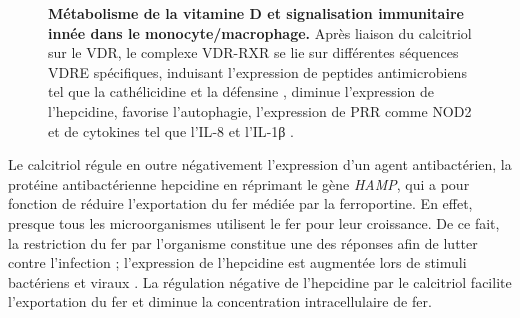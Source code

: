 \documentclass[
  a4paper,
  DIV=11,
  numbers=noendperiod,
  listof=totoc]{scrreprt}
\begin{document}
\begin{figure}


\caption[Métabolisme de la vitamine D et signalisation immunitaire innée
dans le
monocyte/macrophage.]{\label{fig-vd-immune-signaling}\textbf{Métabolisme
de la vitamine D et signalisation immunitaire innée dans le
monocyte/macrophage.} Après liaison du calcitriol sur le \ac{VDR}, le
complexe \ac{VDR}-\ac{RXR} se lie sur différentes séquences \ac{VDRE}
spécifiques, induisant l'expression de peptides antimicrobiens tel que
la cathélicidine et la défensine , diminue l'expression de
l'hepcidine, favorise l'autophagie, l'expression de \ac{PRR} comme
\ac{NOD2} et de cytokines tel que l'\ac{IL}-8 et l'\ac{IL}-1β
\autocite{Bishop.2021}.}

\end{figure}%

Le calcitriol régule en outre négativement l'expression d'un agent
antibactérien, la protéine antibactérienne hepcidine en réprimant le
gène \emph{HAMP}, qui a pour fonction de réduire l'exportation du fer
médiée par la ferroportine. En effet, presque tous les microorganismes
utilisent le fer pour leur croissance. De ce fait, la restriction du fer
par l'organisme constitue une des réponses afin de lutter contre
l'infection ; l'expression de l'hepcidine est augmentée lors de stimuli
bactériens et viraux \autocite{Bishop.2021}. La régulation négative de
l'hepcidine par le calcitriol facilite l'exportation du fer et diminue
la concentration intracellulaire de fer.
\end{document}
